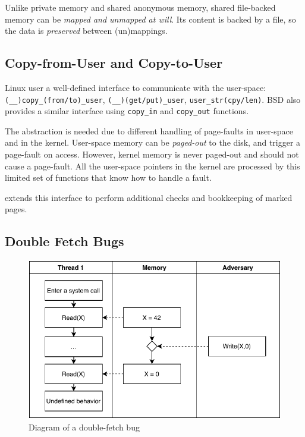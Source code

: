 Unlike private memory and shared anonymous memory, shared file-backed memory can
be \emph{mapped and unmapped at will}. Its content is backed by a file, so the
data is \emph{preserved} between (un)mappings.

\subsection{Copy-from-User and Copy-to-User}
\label{subsec:copy}

Linux user a well-defined interface to communicate with the user-space:
\texttt{(\_\_)copy\_(from/to)\_user}, \texttt{(\_\_)(get/put)\_user},
\texttt{user\_str(cpy/len)}. BSD also provides a similar interface using
\texttt{copy\_in} and \texttt{copy\_out} functions.

The abstraction is needed due to different handling of page-faults in user-space
and in the kernel. User-space memory can be \emph{paged-out} to the disk, and
trigger a page-fault on access. However, kernel memory is never paged-out and
should not cause a page-fault. All the user-space pointers in the kernel are
processed by this limited set of functions that know how to handle a fault.

\sysname extends this interface to perform additional checks and bookkeeping of
marked pages.

\subsection{Double Fetch Bugs}
\label{subsec:doublefetch}


\begin{figure}[]
  \centering
  \includegraphics[width=.85\linewidth]{img/doublefetch.pdf}
  \caption{Diagram of a double-fetch bug}
  \label{fig:doublefetch}
\end{figure}

